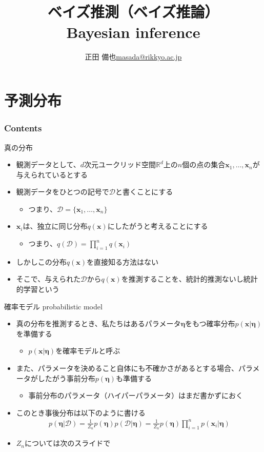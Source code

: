 \documentclass[aspectratio=169,unicode,dvipdfmx,14pt]{beamer}
\title{ \\ベイズ推測（ベイズ推論）\\ Bayesian inference}
\author{\texorpdfstring{正田 備也\newline\href{mailto:masada@rikkyo.ac.jp}{masada@rikkyo.ac.jp}}{正田 備也}}
\date{}
\begin{document}
\begin{frame}
\titlepage
\end{frame}

\section{予測分布}

\begin{frame}\frametitle{Contents}
\Large \tableofcontents[currentsection]
\end{frame}

\begin{frame}{真の分布}
\begin{itemize}
\item 観測データとして、$d$次元ユークリッド空間$\mathbb{R}^d$上の$n$個の点の集合$\bm{x}_1,\ldots,\bm{x}_n$が与えられているとする
\item 観測データをひとつの記号で$\mathcal{D}$と書くことにする
\begin{itemize}
\item つまり、$\mathcal{D}=\{ \bm{x}_1,\ldots,\bm{x}_n \}$
\end{itemize}
\item $\bm{x}_i$は、独立に同じ分布$q(\bm{x})$にしたがうと考えることにする
\begin{itemize}
\item つまり、$q(\mathcal{D}) = \prod_{i=1}^n q(\bm{x}_i)$
\end{itemize}
\item しかしこの分布$q(\bm{x})$を直接知る方法はない
\item そこで、与えられた$\mathcal{D}$から$q(\bm{x})$を推測することを、統計的推測ないし統計的学習という
\end{itemize}
\end{frame}

\begin{frame}{確率モデル probabilistic model}
\begin{itemize}
\item 真の分布を推測するとき、私たちはあるパラメータ$\bm{\eta}$をもつ確率分布$p(\bm{x}|\bm{\eta})$を準備する
\begin{itemize}
\item $p(\bm{x}|\bm{\eta})$を確率モデルと呼ぶ
\end{itemize}
\item また、パラメータを決めること自体にも不確かさがあるとする場合、パラメータがしたがう事前分布$p(\bm{\eta})$も準備する
\begin{itemize}
\item 事前分布のパラメータ（ハイパーパラメータ）はまだ書かずにおく
\end{itemize}
\item このとき事後分布は以下のように書ける
\begin{align}
p(\bm{\eta} | \mathcal{D}) = \frac{1}{Z_n} p(\bm{\eta}) p(\mathcal{D}|\bm{\eta})
= \frac{1}{Z_n} p(\bm{\eta}) \prod_{i=1}^n p(\bm{x}_i | \bm{\eta})
\label{eq:posterior}
\end{align}
\item $Z_n$については次のスライドで
\end{itemize}
\end{frame}
\end{document}
